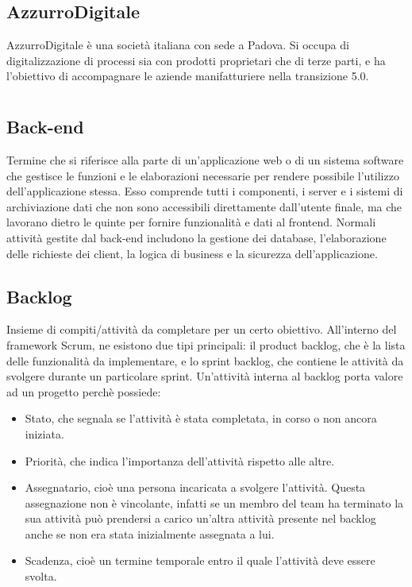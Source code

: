 \subsection*{AzzurroDigitale}
AzzurroDigitale è una società italiana con sede a Padova. Si occupa di digitalizzazione di processi sia con prodotti proprietari che di terze parti, e 
ha l’obiettivo di accompagnare le aziende manifatturiere nella transizione 5.0.

\newpage



\section{}

\hypertarget{sec:back-end}{}
\subsection*{Back-end}
Termine che si riferisce alla parte di un'applicazione web o di un sistema software che gestisce le funzioni e le 
elaborazioni necessarie per rendere possibile l'utilizzo dell'applicazione stessa. Esso comprende tutti i componenti, 
i server e i sistemi di archiviazione dati che non sono accessibili direttamente dall'utente finale, ma che lavorano 
dietro le quinte per fornire funzionalità e dati al frontend. Normali attività gestite dal back-end includono la 
gestione dei database, l'elaborazione delle richieste dei client, la logica di business e la sicurezza 
dell'applicazione.

\subsection*{Backlog}
Insieme di compiti/attività da completare per un certo obiettivo. All’interno del framework Scrum, ne esistono due tipi principali: il product backlog, 
che è la lista delle funzionalità da implementare, e lo sprint backlog, che contiene le attività da svolgere durante un particolare sprint.
Un’attività interna al backlog porta valore ad un progetto perchè possiede:
\begin{itemize}
    \item Stato, che segnala se l’attività è stata completata, in corso o non ancora iniziata.
    \item Priorità, che indica l’importanza dell’attività rispetto alle altre.
    \item Assegnatario, cioè una persona incaricata a svolgere l’attività. Questa assegnazione non è vincolante, infatti se un membro del team ha terminato 
    la sua attività può prendersi a carico un’altra attività presente nel backlog anche se non era stata inizialmente assegnata a lui.
    \item Scadenza, cioè un termine temporale entro il quale l’attività deve essere svolta.
\end{itemize}

